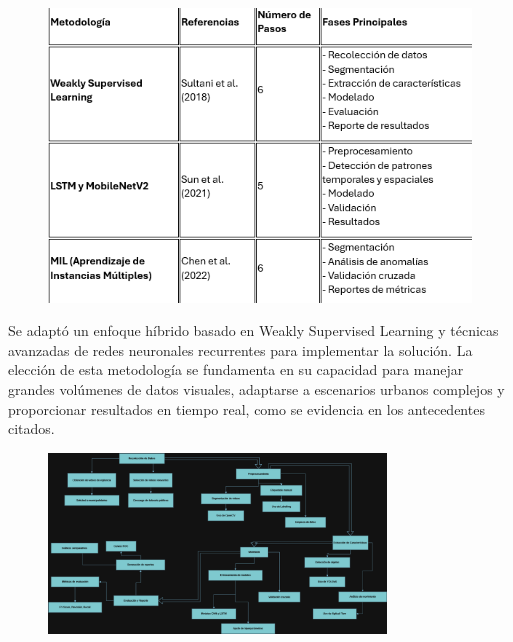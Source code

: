 \begin{figure}[h] %
    \centering
    \includegraphics[width=1.0\textwidth]{4/figures/proceso.png} %
    \label{fig:ejemplo} %
\end{figure}
\clearpage

Se adaptó un enfoque híbrido basado en Weakly Supervised Learning y técnicas avanzadas de redes neuronales recurrentes para implementar la solución. La elección de esta metodología se fundamenta en su capacidad para manejar grandes volúmenes de datos visuales, adaptarse a escenarios urbanos complejos y proporcionar resultados en tiempo real, como se evidencia en los antecedentes citados.


\begin{figure}[h] %
    \centering
    \includegraphics[width=0.8\textwidth]{4/propuesta.png} %
    \label{fig:ejemplo} %
\end{figure}

